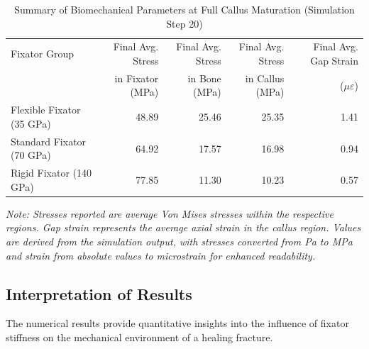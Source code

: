 \documentclass{article}
\begin{document}
\begin{table}[h!]
  \centering
  \caption{Summary of Biomechanical Parameters at Full Callus Maturation (Simulation Step 20)}
  \label{tab:final_results}
  \begin{tabular}{lrrrr}
    \toprule
    Fixator Group              & Final Avg. Stress & Final Avg. Stress & Final Avg. Stress & Final Avg. Gap Strain \\
                               & in Fixator (MPa)  & in Bone (MPa)     & in Callus (MPa)   & ($\mu\varepsilon$)    \\
    \midrule
    Flexible Fixator (35 GPa)  & 48.89             & 25.46             & 25.35             & 1.41                  \\
    Standard Fixator (70 GPa)  & 64.92             & 17.57             & 16.98             & 0.94                  \\
    Rigid Fixator    (140 GPa) & 77.85             & 11.30             & 10.23             & 0.57                  \\
    \bottomrule
  \end{tabular}

  \vspace{0.5em}
  \footnotesize{\textit{Note: Stresses reported are average Von Mises stresses within the respective regions. Gap strain represents the average axial strain in the callus region. Values are derived from the simulation output, with stresses converted from Pa to MPa and strain from absolute values to microstrain for enhanced readability.}}
\end{table}

\subsection{Interpretation of Results}

The numerical results provide quantitative insights into the influence of fixator stiffness on the mechanical environment of a healing fracture.
\end{document}

